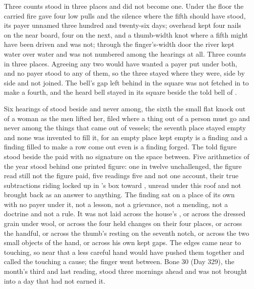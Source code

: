 \scenebreak

Three counts stood in three places and did not become one. Under the floor the carried fire gave four low pulls and the silence where the fifth should have stood, its payer unnamed three hundred and twenty-six days; overhead  kept four nails on the near board, four on the next, and a thumb-width knot where a fifth might have been driven and was not; through the finger's-width door the river kept water over water and was not numbered among the hearings at all. Three counts in three places. Agreeing any two would have wanted a payer put under both, and no payer stood to any of them, so the three stayed where they were, side by side and not joined. The bell's gap left behind in the square was not fetched in to make a fourth, and the heard bell stayed in its square beside the told bell of .

Six hearings of  stood beside and never among, the sixth the small flat knock out of a woman as the men lifted her, filed where a thing out of a person must go and never among the things that came out of vessels; the seventh place stayed empty and none was invented to fill it, for an empty place kept empty is a finding and a finding filled to make a row come out even is a finding forged. The told figure stood beside the paid with no signature on the space between. Five arithmetics of the year stood behind one printed figure: one in twelve unchallenged, the figure read still not the figure paid, five readings five and not one account, their true subtractions riding locked up  in 's box toward , unread under this roof and not brought back as an answer to anything. The finding sat on a place of its own with no payer under it, not a lesson, not a grievance, not a mending, not a doctrine and not a rule. It was not laid across the house's , or across the dressed grain under wool, or across the four held changes on their four places, or across the handful, or across the thumb's resting on the seventh notch, or across the two small objects of the hand, or across his own kept gaps. The edges came near to touching, so near that a less careful hand would have pushed them together and called the touching a cause; the finger went between. Bone 30 (Day 329), the month's third and last reading, stood three mornings ahead and was not brought into a day that had not earned it.

